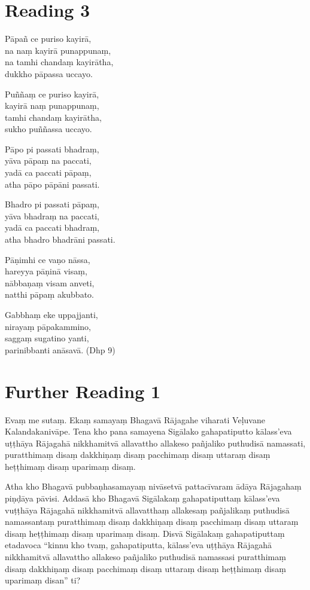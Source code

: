 \section*{Reading 3}

Pāpañ ce puriso kayirā,\\
na naṃ kayirā punappunaṃ,\\
na tamhi chandaṃ kayirātha,\\
dukkho pāpassa uccayo.

Puññaṃ ce puriso kayirā,\\
kayirā naṃ punappunaṃ,\\
tamhi chandaṃ kayirātha,\\
sukho puññassa uccayo.

Pāpo pi passati bhadraṃ,\\
yāva pāpaṃ na paccati,\\
yadā ca paccati pāpaṃ,\\
atha pāpo pāpāni passati.

Bhadro pi passati pāpaṃ,\\
yāva bhadraṃ na paccati,\\
yadā ca paccati bhadraṃ,\\
atha bhadro bhadrāni passati.

Pāṇimhi ce vaṇo nāssa,\\
hareyya pāṇinā visaṃ,\\
nābbaṇaṃ visam anveti,\\
natthi pāpaṃ akubbato.

Gabbhaṃ eke uppajjanti,\\
nirayaṃ pāpakammino,\\
saggaṃ sugatino yanti,\\
parinibbanti anāsavā. (Dhp 9)

\section*{Further Reading 1}

Evaṃ me sutaṃ. Ekaṃ samayaṃ Bhagavā Rājagahe viharati Veḷuvane Kalandakanivāpe. Tena kho pana samayena Sigālako gahapatiputto kālass’eva uṭṭhāya Rājagahā nikkhamitvā allavattho allakeso pañjaliko puthudisā namassati, puratthimaṃ disaṃ dakkhiṇaṃ disaṃ pacchimaṃ disaṃ uttaraṃ disaṃ heṭṭhimaṃ disaṃ uparimaṃ disaṃ.

Atha kho Bhagavā pubbaṇhasamayaṃ nivāsetvā pattacīvaram ādāya Rājagahaṃ piṇḍāya pāvisi. Addasā kho Bhagavā Sigālakaṃ gahapatiputtaṃ kālass’eva vuṭṭhāya Rājagahā nikkhamitvā allavatthaṃ allakesaṃ pañjalikaṃ puthudisā namassantaṃ puratthimaṃ disaṃ dakkhiṇaṃ disaṃ pacchimaṃ disaṃ uttaraṃ disaṃ heṭṭhimaṃ disaṃ uparimaṃ disaṃ. Disvā Sigālakaṃ gahapatiputtaṃ etadavoca “kinnu kho tvaṃ, gahapatiputta, kālass’eva uṭṭhāya Rājagahā nikkhamitvā allavattho allakeso pañjaliko puthudisā namassasi puratthimaṃ disaṃ dakkhiṇaṃ disaṃ pacchimaṃ disaṃ uttaraṃ disaṃ heṭṭhimaṃ disaṃ uparimaṃ disan” ti?

